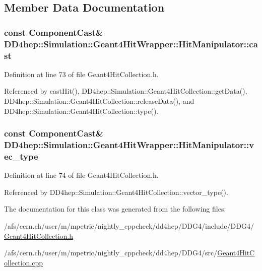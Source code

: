 \subsection{Member Data Documentation}
\hypertarget{class_d_d4hep_1_1_simulation_1_1_geant4_hit_wrapper_1_1_hit_manipulator_a81d93c2f45fdb16c6b590401236f1ed5}{
\subsubsection[{cast}]{\setlength{\rightskip}{0pt plus 5cm}const {\bf ComponentCast}\& {\bf DD4hep::Simulation::Geant4HitWrapper::HitManipulator::cast}}}
\label{class_d_d4hep_1_1_simulation_1_1_geant4_hit_wrapper_1_1_hit_manipulator_a81d93c2f45fdb16c6b590401236f1ed5}


Definition at line 73 of file Geant4HitCollection.h.

Referenced by castHit(), DD4hep::Simulation::Geant4HitCollection::getData(), DD4hep::Simulation::Geant4HitCollection::releaseData(), and DD4hep::Simulation::Geant4HitCollection::type().\hypertarget{class_d_d4hep_1_1_simulation_1_1_geant4_hit_wrapper_1_1_hit_manipulator_abe16127974bebf369e7719b4e72c0647}{
\subsubsection[{vec\_\-type}]{\setlength{\rightskip}{0pt plus 5cm}const {\bf ComponentCast}\& {\bf DD4hep::Simulation::Geant4HitWrapper::HitManipulator::vec\_\-type}}}
\label{class_d_d4hep_1_1_simulation_1_1_geant4_hit_wrapper_1_1_hit_manipulator_abe16127974bebf369e7719b4e72c0647}


Definition at line 74 of file Geant4HitCollection.h.

Referenced by DD4hep::Simulation::Geant4HitCollection::vector\_\-type().

The documentation for this class was generated from the following files:\begin{DoxyCompactItemize}
\item 
/afs/cern.ch/user/m/mpetric/nightly\_\-cppcheck/dd4hep/DDG4/include/DDG4/\hyperlink{_geant4_hit_collection_8h}{Geant4HitCollection.h}\item 
/afs/cern.ch/user/m/mpetric/nightly\_\-cppcheck/dd4hep/DDG4/src/\hyperlink{_geant4_hit_collection_8cpp}{Geant4HitCollection.cpp}\end{DoxyCompactItemize}
